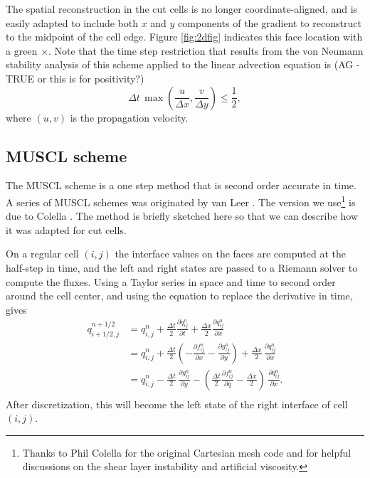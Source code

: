 The spatial reconstruction in the cut cells is no longer
coordinate-aligned, and is easily adapted to  
include both $x$ and $y$ components of the gradient to 
reconstruct to the midpoint of the cell edge. 
Figure \ref{fig:2dfig}  indicates this face location with a green $\times$.
Note that the time step restriction that results from the von Neumann 
stability analysis of this scheme applied to the linear advection equation is  (AG -
TRUE or this is for positivity?)
\begin{equation}
\Delta t \,  \max\left(\frac{u}{\Delta x},\frac{v}{\Delta y}\right) \leq \frac{1}{2} ,
\end{equation}
where $(u,v)$ is the propagation velocity.  

\subsection{MUSCL scheme}
The MUSCL scheme is a one step method that is second order accurate in
time. A series of MUSCL schemes  was originated by van Leer 
\cite{vanleer:muscl}. The version we use\footnote{Thanks to Phil 
Colella for the original Cartesian mesh code and for helpful discussions on the shear
layer instability and artificial viscosity.}
is due to Colella \cite{Colella:Unsplit}.
The method is briefly sketched here so that we can describe how it was
adapted for cut cells. 

On a regular cell $(i,j)$ the interface values on the 
faces are computed at the half-step in time, and the left and right states
are passed to a Riemann
solver to compute the fluxes.
Using a Taylor series in space and time to second order around the
cell center, and using the equation to replace the derivative in time,  gives
\begin{equation}\label{taylor}
\begin{split}
q_{i+1/2,j}^{n+1/2} & = q_{i,j}^n + 
              \frac{\Delta t}{2} \frac{\partial q_{ij}^n}{\partial t} + 
              \frac{\Delta x}{2} \frac{\partial q_{ij}^n}{\partial x} \\[.08in]
            &  = q_{i,j}^n + \frac{\Delta t}{2} 
            (-\frac{\partial f_{ij}^n}{\partial x} -
             \frac{\partial g_{ij}^n}{\partial y})  +
             \frac{\Delta x}{2} \, \frac{\partial q_{ij}^n}{\partial x} \\[.08in]
            &  = q_{i,j}^n - \frac{\Delta t}{2} \, 
             \frac{\partial g_{ij}^n}{\partial y}  -
            ( \frac{\Delta t}{2} 
            \frac{\partial f_{ij}^n}{\partial q} -
             \frac{\Delta x}{2} ) \,\frac{\partial q_{ij}^n}{\partial x} . \\[.08in]
\end{split}
\end{equation}
After discretization, this will become the left state of the right interface
of cell $(i,j)$.

